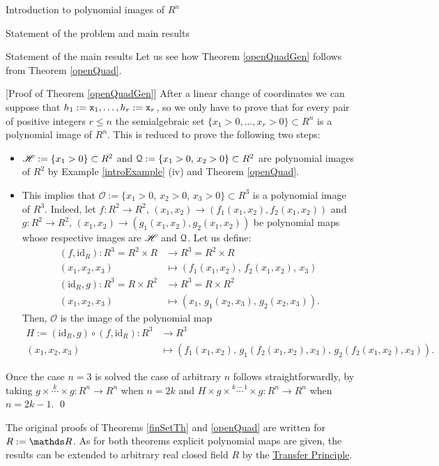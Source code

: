\documentclass[11pt, a4paper, english, twoside, notitlepage, openright]{report}
\begin{document}
\begin{chapter}{Introduction to polynomial images of $R^n$}
\begin{section}{Statement of the problem and main results}
\begin{subsection}{Statement of the main results}
Let us see how Theorem \ref{openQuadGen} follows from Theorem \ref{openQuad}.
		
\vspace{1mm}		
		
[Proof of Theorem \ref{openQuadGen}] After a linear change of coordinates we can suppose that $h_1:={\tt x}_1,\dots,h_r:={\tt x}_r$, so we only have to prove that for every pair of positive integers $r\leq n$ the semialgebraic set $\{x_1>0,\dots,x_r>0\}\subset R^n$ is a polynomial image of $R^n$. This is reduced to prove the following two steps:
\begin{itemize}
\item $\mathscr{H}:=\{x_1>0\}\subset R^2$ and $\mathcal{Q}:=\{x_1>0,\,x_2>0\}\subset R^2$ are polynomial images of $R^2$ by Example \ref{introExample} (iv) and Theorem \ref{openQuad}.
\item This implies that $\mathscr{O}:=\{x_1>0,\,x_2>0,\,x_3>0\}\subset R^3$ is a polynomial image of $R^3$. Indeed, let $f:R^2\to R^2,\, (x_1,x_2)\to(f_1(x_1,x_2),f_2(x_1,x_2))$ and $g:R^2\to R^2,\,(x_1,x_2)\to(g_1(x_1,x_2),g_2(x_1,x_2))$ be polynomial maps whose respective images are $\mathscr{H}$ and $\mathcal{Q}$. Let us define:
\begin{align*}
(f,\text{id}_R):R^3=R^2\times R&\to R^3=R^2\times R\\
(x_1,x_2,x_3) &\mapsto (f_1(x_1,x_2),\,f_2(x_1,x_2),\,x_3)\\
(\text{id}_R,g):R^3=R\times R^2&\to R^3=R\times R^2\\
(x_1,x_2,x_3) &\mapsto (x_1,\,g_1(x_2,x_3),\,g_2(x_2,x_3)).
\end{align*}
Then, $\mathscr{O}$ is the image of the polynomial map 
\begin{align*}
H:=(\text{id}_R,g)\circ(f,\text{id}_R):R^3&\to R^3\\
(x_1,x_2,x_3) &\mapsto (f_1(x_1,x_2),\,g_1(f_2(x_1,x_2),x_3),\,g_2(f_2(x_1,x_2),x_3)).
\end{align*}
\end{itemize} 
Once the case $n=3$ is solved the case of arbitrary $n$ follows straightforwardly, by taking $g\times\overset{k}{\cdots} \times g:R^n\to R^n$ when $n=2k$ and $H\times g\times\overset{k-1}{\cdots}\times g:R^n\to R^n$ when $n=2k-1$. \qed

\vspace{1mm}
		
The original proofs of Theorems \ref{finSetTh} and \ref{openQuad} are written for $R:=\R$. As for both theorems explicit polynomial maps are given, the results can be extended to arbitrary real closed field $R$ by the \hyperref[TP]{Transfer Principle}.
\end{subsection}
\end{section}


\end{chapter}
\end{document}
